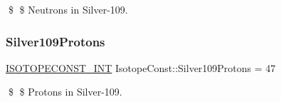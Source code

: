 \$ \$ Neutrons in Silver-\/109. \mbox{\label{group___isotope_const-_silver-_ag109_ga47fc0ccd84408b3661480d4feb0bfcce}} 
\subsubsection{\texorpdfstring{Silver109\+Protons}{Silver109Protons}}
{\footnotesize\ttfamily \mbox{\hyperlink{group___isotope_const-_macros_ga5f18360b3e99483a35c32d789e62621c}{I\+S\+O\+T\+O\+P\+E\+C\+O\+N\+S\+T\+\_\+\+I\+NT}} Isotope\+Const\+::\+Silver109\+Protons = 47}

\$ \$ Protons in Silver-\/109. 